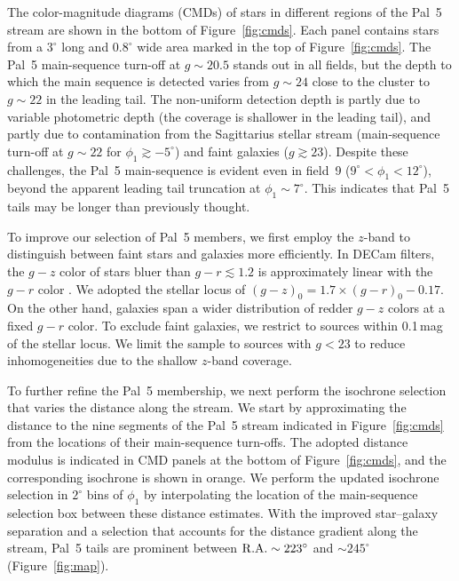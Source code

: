 \documentclass[twocolumn]{aastex62}
\begin{document}
The color-magnitude diagrams (CMDs) of stars in different regions of the Pal~5 stream are shown in the bottom of Figure~\ref{fig:cmds}.
Each panel contains stars from a $3^\circ$ long and $0.8^\circ$ wide area marked in the top of Figure~\ref{fig:cmds}.
The Pal~5 main-sequence turn-off at $g\sim20.5$ stands out in all fields, but the depth to which the main sequence is detected varies from $g\sim24$ close to the cluster to $g\sim22$ in the leading tail.
The non-uniform detection depth is partly due to variable photometric depth (the coverage is shallower in the leading tail), and partly due to contamination from the Sagittarius stellar stream (main-sequence turn-off at $g\sim22$ for $\phi_1\gtrsim-5^\circ$) and faint galaxies ($g\gtrsim23$). 
Despite these challenges, the Pal~5 main-sequence is evident even in field~9 ($9^\circ<\phi_1<12^\circ$), beyond the apparent leading tail truncation at $\phi_1\sim7^\circ$.
This indicates that Pal~5 tails may be longer than previously thought.

To improve our selection of Pal~5 members, we first employ the $z$-band to distinguish between faint stars and galaxies more efficiently.
In DECam filters, the $g-z$ color of stars bluer than $g-r\lesssim1.2$ is approximately linear with the $g-r$ color \citep[e.g.,][]{dey2019}.
We adopted the stellar locus of $(g-z)_0 = 1.7\times(g-r)_0 -0.17$.
On the other hand, galaxies span a wider distribution of redder $g-z$ colors at a fixed $g-r$ color.
To exclude faint galaxies, we restrict to sources within 0.1\,mag of the stellar locus.
We limit the sample to sources with $g<23$ to reduce inhomogeneities due to the shallow $z$-band coverage.

To further refine the Pal~5 membership, we next perform the isochrone selection that varies the distance along the stream.
We start by approximating the distance to the nine segments of the Pal~5 stream indicated in Figure~\ref{fig:cmds} from the locations of their main-sequence turn-offs.
The adopted distance modulus is indicated in CMD panels at the bottom of Figure~\ref{fig:cmds}, and the corresponding isochrone is shown in orange.
We perform the updated isochrone selection in $2^\circ$ bins of $\phi_1$ by interpolating the location of the main-sequence selection box between these distance estimates.
With the improved star--galaxy separation and a selection that accounts for the distance gradient along the stream, Pal~5 tails are prominent between $\rm R.A.\sim223^\circ$ and $\sim245^\circ$ (Figure~\ref{fig:map}).
\end{document}
